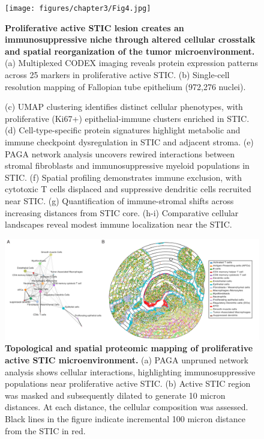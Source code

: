 \begin{refsection}
    \begin{figure}[p]
        \begin{center}
            \texttt{[image: figures/chapter3/Fig4.jpg]}
            \captionsetup{font=small}
            \caption{ \textbf{Proliferative active STIC lesion creates an immunosuppressive niche through altered cellular crosstalk and spatial reorganization of the tumor microenvironment.} (a) Multiplexed CODEX imaging reveals protein expression patterns across 25 markers in proliferative active STIC. (b) Single-cell resolution mapping of Fallopian tube epithelium (972,276 nuclei).}
            \label{chapter3_fig4}
        \end{center}
    \end{figure}
    
    \begin{figure}[h!]
        \ContinuedFloat
        \captionsetup{font=small}
        \caption[]{(c) UMAP clustering identifies distinct cellular phenotypes, with proliferative (Ki67+) epithelial-immune clusters enriched in STIC. (d) Cell-type-specific protein signatures highlight metabolic and immune checkpoint dysregulation in STIC and adjacent stroma. (e) PAGA network analysis uncovers rewired interactions between stromal fibroblasts and immunosuppressive myeloid populations in STIC. (f) Spatial profiling demonstrates immune exclusion, with cytotoxic T cells displaced and suppressive dendritic cells recruited near STIC. (g) Quantification of immune-stromal shifts across increasing distances from STIC core. (h-i) Comparative cellular landscapes reveal modest immune localization near the STIC.}
    \end{figure}

    \begin{figure}[H]
        \begin{center}
            \includegraphics[width=1\textwidth,height=0.9\textheight,keepaspectratio,clip,page=1]{figures/chapter3/FigS3.jpg}
            \captionsetup{font=small}
            \caption{ \textbf{Topological and spatial proteomic mapping of proliferative active STIC microenvironment.} (a) PAGA unpruned network analysis shows cellular interactions, highlighting immunosuppressive populations near proliferative active STIC. (b) Active STIC region was masked and subsequently dilated to generate 10 micron distances. At each distance, the cellular composition was assessed. Black lines in the figure indicate incremental 100 micron distance from the STIC in red.}
            \label{chapter3_figS3}
        \end{center}
    \end{figure}
    

\end{refsection}
